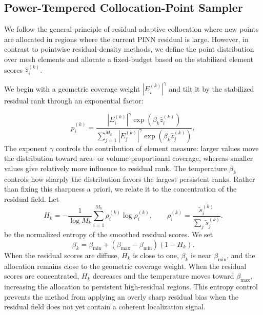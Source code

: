 \subsection{Power-Tempered Collocation-Point Sampler}
\label{subsec:power-tempered}

We follow the general principle of residual-adaptive
collocation \cite{wu2023comprehensive} where new points are allocated in regions where the current PINN residual is large. However, in contrast to
pointwise residual-density methods, we define the point distribution over
mesh elements and allocate a
fixed-budget based on the stabilized element scores
$\hat{z}_i^{(k)}$.

We begin with a geometric coverage weight $|E_i^{(k)}|^\gamma$
and tilt it by the stabilized residual rank through an exponential factor:

\begin{equation}
    p_i^{(k)}
    =
    \frac{
        |E_i^{(k)}|^\gamma
        \exp\!\left(\beta_k \hat{z}_i^{(k)}\right)
    }{
        \sum_{j=1}^{M_k}
        |E_j^{(k)}|^\gamma
        \exp\!\left(\beta_k \hat{z}_j^{(k)}\right)
    },
    \label{eq:apt-distribution}
\end{equation}
The exponent $\gamma$ controls the contribution of element measure: larger
values move the distribution toward area- or volume-proportional coverage,
whereas smaller values give relatively more influence to residual rank.  The
temperature $\beta_k$ controls how sharply the distribution favors the largest
persistent ranks.  Rather than fixing this sharpness a priori, we relate it to
the concentration of the residual field.  Let
\begin{equation}
    H_k
    =
    -\frac{1}{\log M_k}
    \sum_{i=1}^{M_k}
    \rho_i^{(k)}\log\rho_i^{(k)},
    \qquad
    \rho_i^{(k)}
    =
    \frac{\tilde{s}_i^{(k)}}{\sum_j\tilde{s}_j^{(k)}}.
    \label{eq:residual-entropy}
\end{equation}
be the normalized entropy of the smoothed residual scores.  We set
\begin{equation}
    \beta_k
    =
    \beta_{\min}
    +
    \left(\beta_{\max}-\beta_{\min}\right)(1-H_k).
    \label{eq:apt-temperature}
\end{equation}
When the residual scores are diffuse, $H_k$ is close to one, $\beta_k$ is near
$\beta_{\min}$, and the allocation remains close to the geometric coverage
weight.  When the residual scores are concentrated, $H_k$ decreases and the
temperature moves toward $\beta_{\max}$, increasing the allocation to
persistent high-residual regions.  This entropy control prevents the method
from applying an overly sharp residual bias when the residual field does not
yet contain a coherent localization signal.

